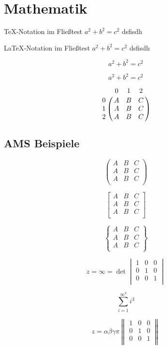 \documentclass[ngerman,12pt]{scrreprt}
\begin{document}
\chapter{Mathematik}

TeX-Notation im Fließtest $a^2+b^2=c^2$ dsfisdh 

LaTeX-Notation im Fließtest \(a^2+b^2=c^2\) dsfisdh 

$$a^2+b^2=c^2$$

\[a^2+b^2=c^2\]

\[
\bordermatrix{%
    & 0 & 1 & 2 \cr
0 & A & B & C \cr
1 & A & B & C \cr
2 & A & B & C \cr
}
\]

\section{AMS Beispiele }

\[
\begin{pmatrix} 
A & B & C \\ 
A & B & C\\ 
A & B & C \\ 
\end{pmatrix}
\]

\[
\begin{bmatrix} 
A & B & C \\ 
A & B & C\\ 
A & B & C \\ 
\end{bmatrix}
\]

\[
\begin{Bmatrix} 
A & B & C \\ 
A & B & C\\ 
A & B & C \\ 
\end{Bmatrix}
\]

\begin{equation}\label{eq:sinnlos}
 z = \infty =  \det 
\begin{vmatrix} 
1 & 0 & 0 \\ 
0 & 1 & 0 \\ 
0 & 0 & 1 \\ 
\end{vmatrix}
\end{equation}

\[ \sum_{i=1}^{\infty^2} i ^3  \]

\[ z = \alpha \beta \gamma \pi 
\begin{Vmatrix} 
1 & 0 & 0 \\ 
0 & 1 & 0 \\ 
0 & 0 & 1 \\ 
\end{Vmatrix}
\]
\end{document}
